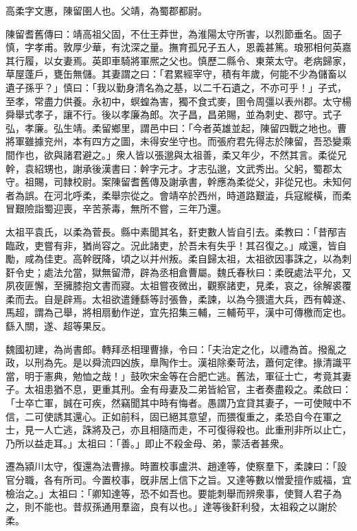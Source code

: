 
\begin{pinyinscope}
高柔字文惠，陳留圉人也。父靖，為蜀郡都尉。

陳留耆舊傳曰：靖高祖父固，不仕王莽世，為淮陽太守所害，以烈節垂名。固子慎，字孝甫。敦厚少華，有沈深之量。撫育孤兄子五人，恩義甚篤。琅邪相何英嘉其行履，以女妻焉。英即車騎將軍熈之父也。慎歷二縣令、東萊太守。老病歸家，草屋蓬戶，甕缶無儲。其妻謂之曰：「君累經宰守，積有年歲，何能不少為儲畜以遺子孫乎？」慎曰：「我以勤身清名為之基，以二千石遺之，不亦可乎！」子式，至孝，常盡力供養。永初中，螟蝗為害，獨不食式麥，圉令周彊以表州郡。太守楊舜舉式孝子，讓不行。後以孝廉為郎。次子昌，昌弟賜，並為刺史、郡守。式子弘，孝廉。弘生靖。柔留鄉里，謂邑中曰：「今者英雄並起，陳留四戰之地也。曹將軍雖據兖州，本有四方之圖，未得安坐守也。而張府君先得志於陳留，吾恐變乘間作也，欲與諸君避之。」衆人皆以張邈與太祖善，柔又年少，不然其言。柔從兄幹，袁紹甥也，謝承後漢書曰：幹字元才。才志弘邈，文武秀出。父躬，蜀郡太守。祖賜，司隷校尉。案陳留耆舊傳及謝承書，幹應為柔從父，非從兄也。未知何者為誤。在河北呼柔，柔舉宗從之。會靖卒於西州，時道路艱澁，兵寇縱橫，而柔冒艱險詣蜀迎喪，辛苦荼毒，無所不嘗，三年乃還。

太祖平袁氏，以柔為菅長。縣中素聞其名，姧吏數人皆自引去。柔教曰：「昔邴吉臨政，吏嘗有非，猶尚容之。況此諸吏，於吾未有失乎！其召復之。」咸還，皆自勵，咸為佳吏。高幹旣降，頃之以并州叛。柔自歸太祖，太祖欲因事誅之，以為刺姧令史；處法允當，獄無留滯，辟為丞相倉曹屬。魏氏春秋曰：柔旣處法平允，又夙夜匪懈，至擁膝抱文書而寢。太祖嘗夜微出，觀察諸吏，見柔，哀之，徐解裘覆柔而去。自是辟焉。太祖欲遣鍾繇等討張魯，柔諫，以為今猥遣大兵，西有韓遂、馬超，謂為己舉，將相扇動作逆，宜先招集三輔，三輔苟平，漢中可傳檄而定也。繇入關，遂、超等果反。

魏國初建，為尚書郎。轉拜丞相理曹掾，令曰：「夫治定之化，以禮為首。撥亂之政，以刑為先。是以舜流四凶族，臯陶作士。漢祖除秦苛法，蕭何定律。掾清識平當，明于憲典，勉恤之哉！」鼓吹宋金等在合肥亡逃。舊法，軍征士亡，考竟其妻子。太祖患猶不息，更重其刑。金有母妻及二弟皆給官，主者奏盡殺之。柔啟曰：「士卒亡軍，誠在可疾，然竊聞其中時有悔者。愚謂乃宜貸其妻子，一可使賊中不信，二可使誘其還心。正如前科，固已絕其意望，而猥復重之，柔恐自今在軍之士，見一人亡逃，誅將及己，亦且相隨而走，不可復得殺也。此重刑非所以止亡，乃所以益走耳。」太祖曰：「善。」即止不殺金母、弟，蒙活者甚衆。

遷為潁川太守，復還為法曹掾。時置校事盧洪、趙達等，使察羣下，柔諫曰：「設官分職，各有所司。今置校事，旣非居上信下之旨。又達等數以憎愛擅作威福，宜檢治之。」太祖曰：「卿知達等，恐不如吾也。要能刺舉而辨衆事，使賢人君子為之，則不能也。昔叔孫通用羣盜，良有以也。」達等後姧利發，太祖殺之以謝於柔。


\end{pinyinscope}
